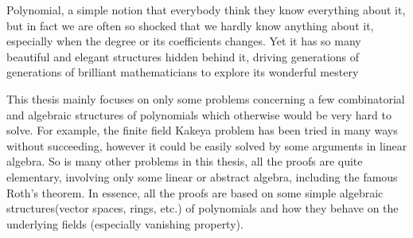 Polynomial, a simple notion that everybody think they know everything about it, but in fact we are often so 
shocked that we hardly know anything about it, especially when the degree or its coefficients changes. Yet it 
has so many beautiful and elegant structures hidden behind it, driving generations of generations of brilliant 
mathematicians to explore its wonderful mestery \par
This thesis mainly focuses on only some problems concerning a few combinatorial and algebraic structures of 
polynomials which otherwise would be very hard to solve. For example, the finite field Kakeya problem has been 
tried in many ways without succeeding, however it could be easily solved by some arguments in linear algebra. 
So is many other problems in this thesis, all the proofs are quite elementary, involving only some linear or 
abstract algebra, including the famous Roth's theorem. In essence, all the proofs are based on some simple 
algebraic structures(vector spaces, rings, etc.) of polynomials and how they behave on the underlying fields
(especially vanishing property).